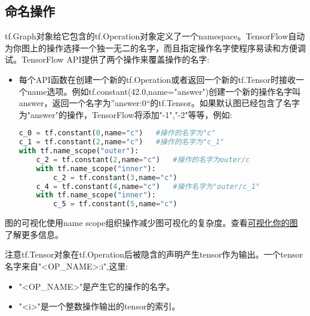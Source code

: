 \subsection{命名操作}
tf.Graph对象给它包含的tf.Operation对象定义了一个namespace。TensorFlow自动为你图上的操作选择一个独一无二的名字，而且指定操作名字使程序易读和方便调试。TensorFlow API提供了两个操作来覆盖操作的名字:
\begin{itemize}
\item 每个API函数在创建一个新的tf.Operation或者返回一个新的tf.Tensor时接收一个name选项。例如tf.constant(42.0,name="answer")创建一个新的操作名字叫answer，返回一个名字为”answer:0“的tf.Tensor。如果默认图已经包含了名字为"answer"的操作，TensorFlow将添加"-1","-2"等等，例如:
\begin{lstlisting}[language=Python]
c_0 = tf.constant(0,name="c")	#操作的名字为"c"
c_1 = tf.constant(2,name="c")	#操作的名字为"c_1"
with tf.name_scope("outer"):
    c_2 = tf.constant(2,name="c")	#操作的名字为outer/c
    with tf.name_scope("inner"):
        c_2 = tf.constant(3,name="c")
    c_4 = tf.constant(4,name="c")	#操作名字为"outer/c_1"
    with tf.name_scope("inner"):
        c_5 = tf.constant(5,name="c")
\end{lstlisting}
\end{itemize}
图的可视化使用name scope组织操作减少图可视化的复杂度。查看\href{https://www.tensorflow.org/programmers_guide/graphs?hl=zh-cn#visualizing_your_graph}{可视化你的图}了解更多信息。

注意tf.Tensor对象在tf.Operation后被隐含的声明产生tensor作为输出。一个tensor名字来自"<OP\_NAME>:i",这里:
\begin{itemize}
\item "<OP\_NAME>"是产生它的操作的名字。
\item "<i>"是一个整数操作输出的tensor的索引。
\end{itemize}
